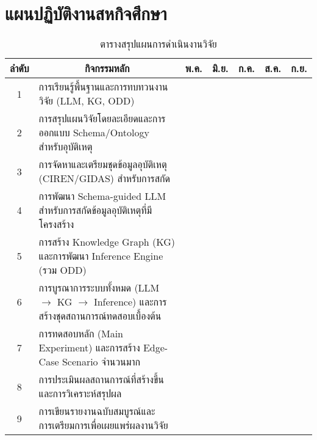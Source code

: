 \section{แผนปฏิบัติงานสหกิจศึกษา}\label{sec:work-plan}

\begin{table}[htbp]
    \centering
    \caption{ตารางสรุปแผนการดำเนินงานวิจัย}
    \label{tab:project-timeline-revised}
\begin{tabular}{|c|p{7cm}|c|c|c|c|c|}
\hline
\multicolumn{1}{|c|}{ลำดับ} & \multicolumn{1}{|c|}{กิจกรรมหลัก} & \multicolumn{1}{|c|}{พ.ค.} & \multicolumn{1}{|c|}{มิ.ย.} & \multicolumn{1}{|c|}{ก.ค.} & \multicolumn{1}{|c|}{ส.ค.} & \multicolumn{1}{|c|}{ก.ย.}\\
\hline
1 & การเรียนรู้พื้นฐานและการทบทวนงานวิจัย (LLM, KG, ODD)
  & \cellcolor{gray!40} & \cellcolor{gray!40} &  &  &  \\
\hline
2 & การสรุปแผนวิจัยโดยละเอียดและการออกแบบ Schema/Ontology สำหรับอุบัติเหตุ
  &  & \cellcolor{gray!40} & \cellcolor{gray!40} &  &  \\
\hline
3 & การจัดหาและเตรียมชุดข้อมูลอุบัติเหตุ (CIREN/GIDAS) สำหรับการสกัด
  &  & \cellcolor{gray!40} & \cellcolor{gray!40} &  &  \\
\hline
4 & การพัฒนา Schema-guided LLM สำหรับการสกัดข้อมูลอุบัติเหตุที่มีโครงสร้าง
  &  &  & \cellcolor{gray!40} & \cellcolor{gray!40} &  \\
\hline
5 & การสร้าง Knowledge Graph (KG) และการพัฒนา Inference Engine (รวม ODD)
  &  &  &  & \cellcolor{gray!40} & \cellcolor{gray!40} \\
\hline
6 & การบูรณาการระบบทั้งหมด (LLM $\rightarrow$ KG $\rightarrow$ Inference) และการสร้างชุดสถานการณ์ทดสอบเบื้องต้น
  &  &  &  & \cellcolor{gray!40} & \cellcolor{gray!40} \\
\hline
7 & การทดสอบหลัก (Main Experiment) และการสร้าง Edge-Case Scenario จำนวนมาก
  &  &  &  &  & \cellcolor{gray!40} \\
\hline
8 & การประเมินผลสถานการณ์ที่สร้างขึ้นและการวิเคราะห์สรุปผล
  &  &  &  &  & \cellcolor{gray!40} \\
\hline
9 & การเขียนรายงานฉบับสมบูรณ์และการเตรียมการเพื่อเผยแพร่ผลงานวิจัย
  &  &  &  & \cellcolor{gray!40} & \cellcolor{gray!40} \\
\hline
\end{tabular}
\end{table}